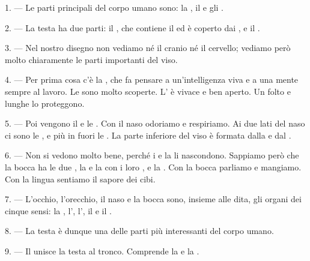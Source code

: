 \VUsaut{4.0mm}
\VUsaut{2.0mm}

\VUsaut{2.4mm}
\VUsaut{3.0mm}

1. --- Le parti principali del corpo umano sono: la , il
 e gli .

\VUsaut{3.0mm}

2. --- La testa ha due parti: il , che contiene il 
ed è coperto dai , e il .

3. --- Nel nostro disegno non vediamo né il cranio né il cervello; vediamo però molto
chiaramente le parti importanti del viso.

4. --- Per prima cosa c'è la , che fa pensare a un'intelligenza viva e
a una mente sempre al lavoro. Le  sono molto scoperte. L'
è vivace e ben aperto. Un folto  e lunghe  lo
proteggono.

5. --- Poi vengono il  e le . Con il naso odoriamo e
respiriamo. Ai due lati del naso ci sono le , e più in fuori le
. La parte inferiore del viso è formata dalla  e dal
.

6. --- Non si vedono molto bene, perché i  e la  li
nascondono. Sappiamo però che la bocca ha le due , la
 e la  con i loro
, e la . Con la bocca parliamo e mangiamo. Con la lingua
sentiamo il sapore dei cibi.

7. --- L'occhio, l'orecchio, il naso e la bocca sono, insieme alle dita, gli organi
dei cinque sensi: la , l', l', il
 e il .

8. --- La testa è dunque una delle parti più interessanti del corpo umano.

\VUsaut{4.4mm}
\VUsaut{3.0mm}

9. --- Il  unisce la testa al tronco. Comprende la  e la
.

